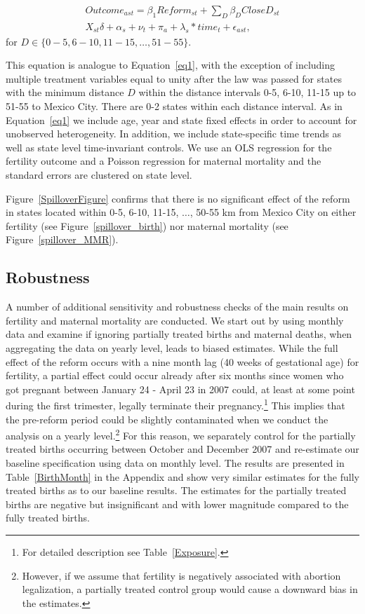\documentclass[a4paper, 11pt]{article}
\begin{document}
\begin{spacing}{2}
\begin{eqnarray}\label{eq3}
Outcome_{ast}= \beta_{1} Reform_{st} + \sum_{D}\beta_{D}CloseD_{st}\nonumber\\
X_{st}\delta +\alpha_{s} + \nu_{t} +\pi_{a}+ \lambda_{s}*time_{t} +\epsilon_{ast},
\end{eqnarray}
for $D\in \{0-5, 6-10, 11-15, \ldots, 51-55\}$.

This equation is analogue to Equation~\eqref{eq1}, with the exception of including multiple treatment variables equal to unity after the law was passed for states with the minimum distance $D$ within the distance intervals 0-5, 6-10, 11-15 up to 51-55 to Mexico City. There are 0-2 states within each distance interval. As in Equation~\eqref{eq1} we include age, year and state fixed effects in order to account for unobserved heterogeneity. In addition, we include state-specific time trends as well as state level time-invariant controls. We use an OLS regression for the fertility outcome and a Poisson regression for maternal mortality and the standard errors are clustered on state level.  


Figure~\ref{SpilloverFigure} confirms that there is no significant effect of the reform in states located within 0-5, 6-10, 11-15, $\ldots$, 50-55 km from Mexico City on either fertility (see Figure~\ref{spillover_birth}) nor maternal mortality (see Figure~\ref{spillover_MMR}). 



\subsection{Robustness}\label{robust}

A number of additional sensitivity and robustness checks of the main results on fertility and maternal mortality are conducted. We start out by using monthly data and examine if ignoring partially treated births and maternal deaths, when aggregating the data on yearly level, leads to biased estimates. While the full effect of the reform occurs with a nine month lag (40 weeks of gestational age) for fertility, a partial effect could occur already after six months since women who got pregnant between January 24 - April 23 in 2007 could, at least at some point during the first trimester, legally terminate their pregnancy.\footnote{For detailed description see Table~\ref{Exposure}.} This implies that the pre-reform period could be slightly contaminated when we conduct the analysis on a yearly level.\footnote{However, if we assume that fertility is negatively associated with abortion legalization, a partially treated control group would cause a downward bias in the estimates.} For this reason, we separately control for the partially treated births occurring between October and December 2007 and re-estimate our baseline specification using data on monthly level. The results are presented in Table~\ref{BirthMonth} in the Appendix and show very similar estimates for the fully treated births as to our baseline results. The estimates for the partially treated births are negative but insignificant and with lower magnitude compared to the fully treated births.   



\end{spacing}
\end{document}
